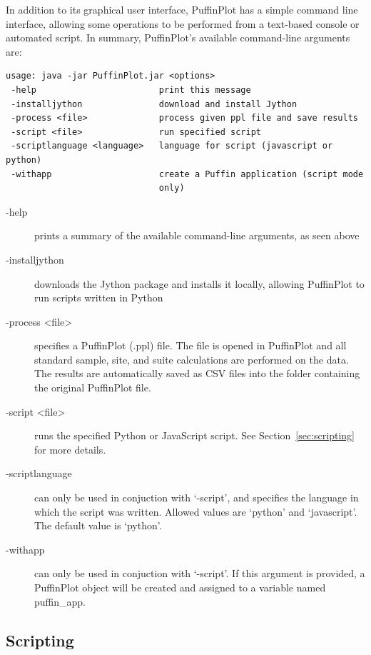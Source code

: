 \documentclass[a4paper,british]{article}
\newcommand{\ppcmd}[1]{\textsf{#1}} %
\begin{document}
In addition to its graphical user interface, PuffinPlot has a simple
command line interface, allowing some operations to be performed from
a text-based console or automated script. In summary, PuffinPlot's
available command-line arguments are:

\begin{verbatim}
usage: java -jar PuffinPlot.jar <options>
 -help                        print this message
 -installjython               download and install Jython
 -process <file>              process given ppl file and save results
 -script <file>               run specified script
 -scriptlanguage <language>   language for script (javascript or python)
 -withapp                     create a Puffin application (script mode
                              only)
\end{verbatim}

\begin{description}

\item[-help] prints a summary of the available command-line arguments,
as seen above
\item[-installjython] downloads the Jython package and installs it
locally, allowing PuffinPlot to run scripts written in Python
\item[-process <file>] specifies a PuffinPlot (.ppl) file. The file is
  opened in PuffinPlot and all standard sample, site, and suite
  calculations are performed on the data. The results are automatically
  saved as CSV files into the folder containing the original PuffinPlot
  file.
\item[-script <file>] runs the specified Python or JavaScript script.
  See Section~\ref{sec:scripting} for more details.
\item[-scriptlanguage] can only be used in conjuction with `-script',
  and specifies the language in which the script was written. 
  Allowed values are `python' and `javascript'. The default value
  is `python'.
\item[-withapp] can only be used in conjuction with `-script'.
  If this argument is provided, a \ppcmd{PuffinPlot} object will be
  created and assigned to a variable named \ppcmd{puffin\_app}.

\end{description}


\subsection{\label{sec:scripting}Scripting}
\end{document}
